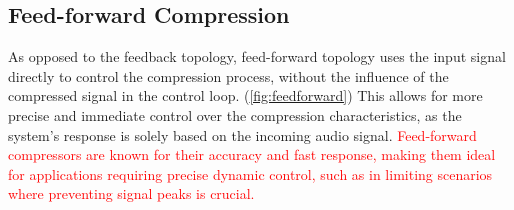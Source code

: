 \documentclass[10pt]{article}
\begin{document}
\begin{multicols*}{2}
\begin{minipage}{\linewidth}
                        
                    \label{fig:feedback}
                
                \end{minipage}
                
            \subsection{Feed-forward Compression}
                As opposed to the feedback topology, feed-forward topology uses the input signal directly to control the compression process, without the influence of the compressed signal in the control loop. (\ref{fig:feedforward}) This allows for more precise and immediate control over the compression characteristics, as the system's response is solely based on the incoming audio signal. \textcolor{red}{Feed-forward compressors are known for their accuracy and fast response, making them ideal for applications requiring precise dynamic control, such as in limiting scenarios where preventing signal peaks is crucial.}\par


\end{multicols*}
\end{document}
